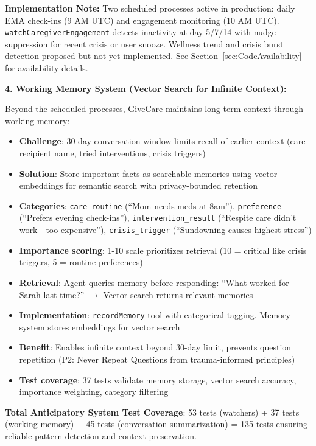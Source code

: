 \documentclass{article}
\begin{document}
\textbf{Implementation Note:} Two scheduled processes active in production: daily EMA check-ins (9 AM UTC) and engagement monitoring (10 AM UTC). \texttt{watchCaregiverEngagement} detects inactivity at day 5/7/14 with nudge suppression for recent crisis or user snooze. Wellness trend and crisis burst detection proposed but not yet implemented. See Section~\ref{sec:CodeAvailability} for availability details.

\textbf{4. Working Memory System (Vector Search for Infinite Context):}

Beyond the scheduled processes, GiveCare maintains long-term context through working memory:

\begin{itemize}
    \item \textbf{Challenge}: 30-day conversation window limits recall of earlier context (care recipient name, tried interventions, crisis triggers)
    \item \textbf{Solution}: Store important facts as searchable memories using vector embeddings for semantic search with privacy-bounded retention
    \item \textbf{Categories}: \texttt{care\_routine} (``Mom needs meds at 8am''), \texttt{preference} (``Prefers evening check-ins''), \texttt{intervention\_result} (``Respite care didn't work - too expensive''), \texttt{crisis\_trigger} (``Sundowning causes highest stress'')
    \item \textbf{Importance scoring}: 1-10 scale prioritizes retrieval (10 = critical like crisis triggers, 5 = routine preferences)
    \item \textbf{Retrieval}: Agent queries memory before responding: ``What worked for Sarah last time?'' $\rightarrow$ Vector search returns relevant memories
    \item \textbf{Implementation}: \texttt{recordMemory} tool with categorical tagging. Memory system stores embeddings for vector search
    \item \textbf{Benefit}: Enables infinite context beyond 30-day limit, prevents question repetition (P2: Never Repeat Questions from trauma-informed principles)
    \item \textbf{Test coverage}: 37 tests validate memory storage, vector search accuracy, importance weighting, category filtering
\end{itemize}

\textbf{Total Anticipatory System Test Coverage}: 53 tests (watchers) + 37 tests (working memory) + 45 tests (conversation summarization) = 135 tests ensuring reliable pattern detection and context preservation.
\end{document}
